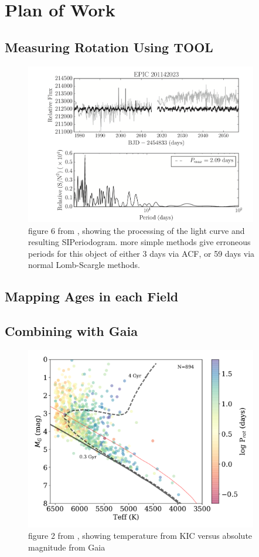 \documentclass[12pt]{article}
\begin{document}
\section{Plan of Work}

\subsection{Measuring Rotation Using TOOL}


\begin{figure}[!th]
\centering
\includegraphics[width=4in]{angus2016_fig6.png}
\caption{
figure 6 from \citet{angus2016}, showing the processing of the light curve and resulting SIPeriodogram. more simple methods give erroneous periods for this object of either 3 days via ACF, or 59 days via normal Lomb-Scargle methods.
}
\label{fig:cmd}
\end{figure}


\subsection{Mapping Ages in each Field}

\subsection{Combining with Gaia}


\begin{figure}[!th]
\centering
\includegraphics[width=4in]{davenport2016_fig2}
\caption{figure 2 from \citet{davenport2017}, showing temperature from KIC versus absolute magnitude from Gaia}
\label{fig:cmd}
\end{figure}
\end{document}
